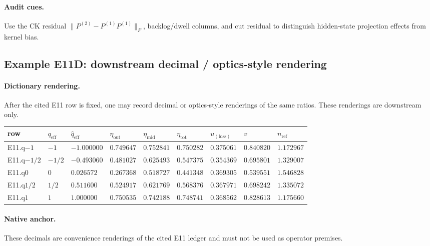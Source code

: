 \paragraph{Audit cues.} Use the CK residual $\|P^{(2)}-P^{(1)}P^{(1)}\|_F$, backlog/dwell columns, and cut residual to distinguish hidden-state projection effects from kernel bias.

\subsection{Example E11D: downstream decimal / optics-style rendering}\label{app:e11-dict}
\paragraph{Dictionary rendering.} After the cited E11 row is fixed, one may record decimal or optics-style renderings of the same ratios. These renderings are downstream only.
{\footnotesize
\begin{center}
\begin{tabular}{@{}lllllllll@{}}
\toprule
row & $q_{\mathrm{eff}}$ & $\widehat q_{\mathrm{eff}}$ & $\eta_{\mathrm{out}}$ & $\eta_{\mathrm{mid}}$ & $\eta_{\mathrm{tot}}$ & $u_{(\mathrm{loss})}$ & $v$ & $n_{\mathrm{ref}}$ \\
\midrule
E11.q$-1$ & $-1$ & $-1.000000$ & $0.749647$ & $0.752841$ & $0.750282$ & $0.375061$ & $0.840820$ & $1.172967$ \\
E11.q$-1/2$ & $-1/2$ & $-0.493060$ & $0.481027$ & $0.625493$ & $0.547375$ & $0.354369$ & $0.695801$ & $1.329007$ \\
E11.q$0$ & $0$ & $0.026572$ & $0.267368$ & $0.518727$ & $0.441348$ & $0.369305$ & $0.539551$ & $1.546828$ \\
E11.q$1/2$ & $1/2$ & $0.511600$ & $0.524917$ & $0.621769$ & $0.568376$ & $0.367971$ & $0.698242$ & $1.335072$ \\
E11.q$1$ & $1$ & $1.000000$ & $0.750535$ & $0.742188$ & $0.748741$ & $0.368562$ & $0.828613$ & $1.175660$ \\
\bottomrule
\end{tabular}
\end{center}}
\paragraph{Native anchor.} These decimals are convenience renderings of the cited E11 ledger and must not be used as operator premises.
